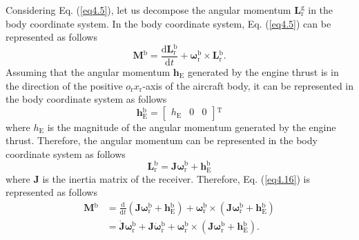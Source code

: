 Considering Eq. (\ref{eq4.5}), let us decompose the angular momentum $\mathbf{L}\mathrm{_r^g}$ in the body coordinate system. In the body coordinate system, Eq. (\ref{eq4.5}) can be represented as follows
\begin{equation}\label{eq4.16}
\mathbf{M}\mathrm{^b} = \frac{\mathrm{d}\mathbf{L}\mathrm{_r^b}}{\mathrm{d}t} + \bm{\omega} \mathrm{_r^b} \times \mathbf{L}\mathrm{_r^b} .
\end{equation}
Assuming that the angular momentum $\mathbf{h}\mathrm{_E}$ generated by the engine thrust is in the direction of the positive $o\mathrm{_r}x\mathrm{_r}$-axis of the aircraft body, it can be represented in the body coordinate system as follows\cite{garza_collection_2003}
\begin{equation}\label{eq4.17}
\mathbf{h}\mathrm{_E^b} = {\left[ {\begin{array}{*{20}{c}}
		{{h_\mathrm{E}}}&0&0
		\end{array}} \right]\mathrm{^T}}
\end{equation}
where ${h_\mathrm{E}}$ is the magnitude of the angular momentum generated by the engine thrust. Therefore, the angular momentum can be represented in the body coordinate system as follows
\begin{equation}\label{eq4.18}
\mathbf{L}\mathrm{_r^b} = \mathbf{J}\bm{\omega}\mathrm{_r^b} + \mathbf{h}\mathrm{_E^b}
\end{equation}
where $\mathbf{J}$ is the inertia matrix of the receiver. Therefore, Eq. (\ref{eq4.16}) is represented as follows
\begin{equation}\label{eq4.19}
\begin{aligned}
\mathbf{M}\mathrm{^b} &= \frac{\mathrm{d}}{{\mathrm{d}t}}\left( \mathbf{J}\bm{\omega}\mathrm {_r^b} + \mathbf{h}\mathrm{_E^b} \right) + \bm{\omega}\mathrm{ _r^b} \times \left( {\mathbf{J}\bm{\omega}\mathrm {_r^b} + \mathbf{h}\mathrm{_E^b}} \right)\\
&= \dot{ \mathbf{J}}\bm{\omega}\mathrm{ _r^b} + \mathbf{J}\dot{ \bm{\omega}}\mathrm{ _r^b} + \bm{\omega}\mathrm{ _r^b} \times \left( \mathbf{J}\bm{\omega}\mathrm{ _r^b} + \mathbf{h}\mathrm{_E^b} \right) .
\end{aligned} 
\end{equation}

